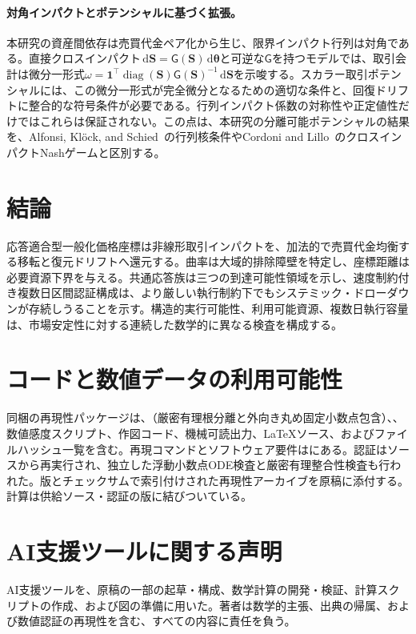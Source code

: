 \documentclass[11pt]{article}
\numberwithin{equation}{section}
\theoremstyle{definition}
\theoremstyle{remark}
\newcommand{\dd}{\,\mathrm{d}}
\newcommand{\one}{\mathbf{1}}
\begin{document}
\paragraph{対角インパクトとポテンシャルに基づく拡張。}
本研究の資産間依存は売買代金ペア化から生じ、限界インパクト行列は対角である。直接クロスインパクト$\dd\bm S=\mathsf G(\bm S)\dd\bm\theta$と可逆な$\mathsf G$を持つモデルでは、取引会計は微分一形式$\omega=\one^\top\operatorname{diag}(\bm S)\mathsf G(\bm S)^{-1}\dd\bm S$を示唆する。スカラー取引ポテンシャルには、この微分一形式が完全微分となるための適切な条件と、回復ドリフトに整合的な符号条件が必要である。行列インパクト係数の対称性や正定値性だけではこれらは保証されない。この点は、本研究の分離可能ポテンシャルの結果を、Alfonsi, Kl\"ock, and Schied~\citep{AlfonsiKlockSchied2016}の行列核条件やCordoni and Lillo~\citep{CordoniLillo2024}のクロスインパクトNashゲームと区別する。

\section{結論}\label{sec:conclusion}
応答適合型一般化価格座標は非線形取引インパクトを、加法的で売買代金均衡する移転と復元ドリフトへ還元する。曲率は大域的排除障壁を特定し、座標距離は必要資源下界を与える。共通応答族は三つの到達可能性領域を示し、速度制約付き複数日区間認証構成は、より厳しい執行制約下でもシステミック・ドローダウンが存続しうることを示す。構造的実行可能性、利用可能資源、複数日執行容量は、市場安定性に対する連続した数学的に異なる検査を構成する。

\section*{コードと数値データの利用可能性}
同梱の再現性パッケージは、（厳密有理根分離と外向き丸め固定小数点包含）、、数値感度スクリプト、作図コード、機械可読出力、LaTeXソース、およびファイルハッシュ一覧を含む。再現コマンドとソフトウェア要件はにある。認証はソースから再実行され、独立した浮動小数点ODE検査と厳密有理整合性検査も行われた。版とチェックサムで索引付けされた再現性アーカイブを原稿に添付する。計算は供給ソース・認証の版に結びついている。

\section*{AI支援ツールに関する声明}
AI支援ツールを、原稿の一部の起草・構成、数学計算の開発・検証、計算スクリプトの作成、および図の準備に用いた。著者は数学的主張、出典の帰属、および数値認証の再現性を含む、すべての内容に責任を負う。
\end{document}
